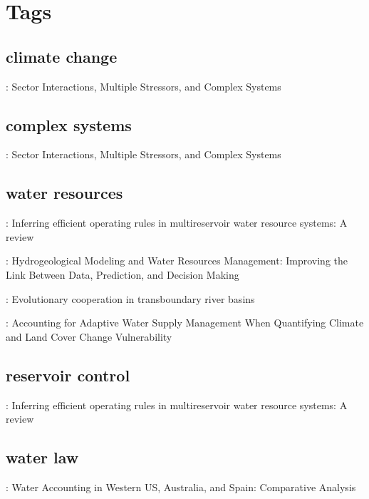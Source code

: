 \documentclass[11pt]{article}
\begin{document}
\section{Tags} 
\subsection{climate change} 
\noindent\citep{Clarke2018}:   Sector Interactions, Multiple Stressors, and Complex Systems
\medskip



\subsection{complex systems} 
\noindent\citep{Clarke2018}:   Sector Interactions, Multiple Stressors, and Complex Systems
\medskip



\subsection{water resources} 
\noindent\citep{Macian-Sorribes2019}:   Inferring efficient operating rules in multireservoir water resource systems: A review
\medskip

\noindent\citep{Harken2019}:   Hydrogeological Modeling and Water Resources Management: Improving the Link Between Data, Prediction, and Decision Making
\medskip

\noindent\citep{Yu2019}:   Evolutionary cooperation in transboundary river basins
\medskip

\noindent\citep{Gorelick2020}:   Accounting for Adaptive Water Supply Management When Quantifying Climate and Land Cover Change Vulnerability
\medskip



\subsection{reservoir control} 
\noindent\citep{Macian-Sorribes2019}:   Inferring efficient operating rules in multireservoir water resource systems: A review
\medskip



\subsection{water law} 
\noindent\citep{Escriva-bou2020}:   Water Accounting in Western US, Australia, and Spain: Comparative Analysis
\medskip
\end{document}
